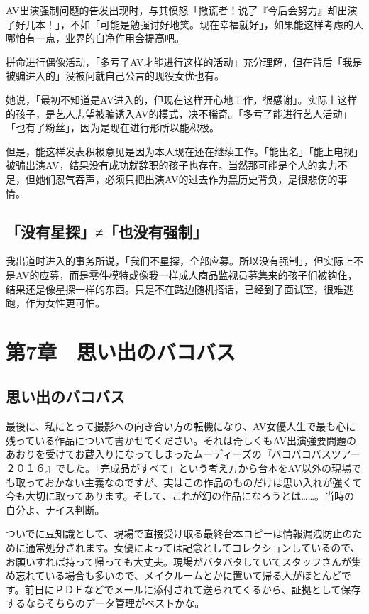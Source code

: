 \documentclass[12pt,UTF8]{ctexbook}
\begin{document}
AV出演强制问题的告发出现时，与其愤怒「撒谎者！说了『今后会努力』却出演了好几本！」，不如「可能是勉强讨好地笑。现在幸福就好」，如果能这样考虑的人哪怕有一点，业界的自净作用会提高吧。

拼命进行偶像活动，「多亏了AV才能进行这样的活动」充分理解，但在背后「我是被骗进入的」没被问就自己公言的现役女优也有。

她说，「最初不知道是AV进入的，但现在这样开心地工作，很感谢」。实际上这样的孩子，是艺人志望被骗诱入AV的模式，决不稀奇。「多亏了能进行艺人活动」「也有了粉丝」，因为是现在进行形所以能积极。

但是，能这样发表积极意见是因为本人现在还在继续工作。「能出名」「能上电视」被骗出演AV，结果没有成功就辞职的孩子也存在。当然那可能是个人的实力不足，但她们忍气吞声，必须只把出演AV的过去作为黑历史背负，是很悲伤的事情。

\section{「没有星探」≠「也没有强制」}

我出道时进入的事务所说，「我们不星探，全部应募。所以没有强制」，但实际上不是AV的应募，而是零件模特或像我一样成人商品监视员募集来的孩子们被钩住，结果还是像星探一样的东西。只是不在路边随机搭话，已经到了面试室，很难逃跑，作为女性更可怕。

\chapter{第7章　思い出のバコバス}

\section{思い出のバコバス}

最後に、私にとって撮影への向き合い方の転機になり、AV女優人生で最も心に残っている作品について書かせてください。それは奇しくもAV出演強要問題のあおりを受けてお蔵入りになってしまったムーディーズの『バコバコバスツアー２０１６』でした。「完成品がすべて」という考え方から台本をAV以外の現場でも取っておかない主義なのですが、実はこの作品のものだけは思い入れが強くて今も大切に取ってあります。そして、これが幻の作品になろうとは……。当時の自分よ、ナイス判断。

ついでに豆知識として、現場で直接受け取る最終台本コピーは情報漏洩防止のために通常処分されます。女優によっては記念としてコレクションしているので、お願いすれば持って帰っても大丈夫。現場がバタバタしていてスタッフさんが集め忘れている場合も多いので、メイクルームとかに置いて帰る人がほとんどです。前日にＰＤＦなどでメールに添付されて送られてくるから、証拠として保存するならそちらのデータ管理がベストかな。
\end{document}
